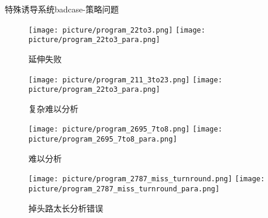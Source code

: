 \documentclass[10pt]{beamer}
\begin{document}
\begin{frame}{特殊诱导系统badcase-策略问题}
	\begin{figure}
		\begin{minipage}[htbp]{0.45\textwidth}
			\centering
				\texttt{[image: picture/program\_22to3.png]}
				\texttt{[image: picture/program\_22to3\_para.png]}
				\caption{延伸失败}
		\end{minipage}
					\begin{minipage}[htbp]{0.45\textwidth}
						\centering
						\texttt{[image: picture/program\_211\_3to23.png]}
						\texttt{[image: picture/program\_22to3\_para.png]}
						\caption{复杂难以分析}
					\end{minipage}

					\begin{minipage}[htbp]{0.45\textwidth}
						\centering
						\texttt{[image: picture/program\_2695\_7to8.png]}
						\texttt{[image: picture/program\_2695\_7to8\_para.png]}
						\caption{难以分析}
					\end{minipage}	
					\begin{minipage}[htbp]{0.45\textwidth}
						\centering
						\texttt{[image: picture/program\_2787\_miss\_turnround.png]}
						\texttt{[image: picture/program\_2787\_miss\_turnround\_para.png]}
						\caption{掉头路太长分析错误}
					\end{minipage}	
	\end{figure}	
\end{frame}
\end{document}
